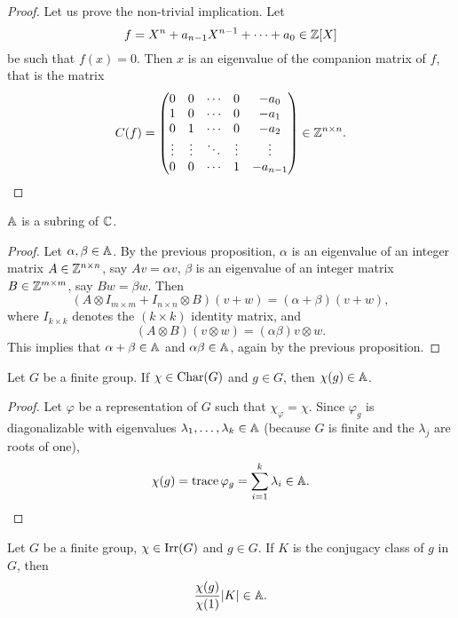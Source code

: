 \begin{proof}
    Let us prove the non-trivial implication. Let 
    \[
    f=X^n+a_{n-1}X^{n-1}+\cdots+a_0\in\mathbb{Z}[X]
    \]
    be such that $f(x)=0$. Then $x$ is an eigenvalue
    of the companion matrix of $f$, that is the matrix
    \[
    C(f)=
    \begin{pmatrix}
    0&0&\cdots &0&-a_{0}\\
    1&0&\cdots &0&-a_{1}\\
    0&1&\cdots &0&-a_{2}\\
    \vdots &\vdots &\ddots &\vdots &\vdots \\
    0&0&\cdots &1&-a_{{n-1}}
    \end{pmatrix}
    \in\mathbb{Z}^{n\times n}.\qedhere 
    \]
\end{proof}

\begin{theorem}
\label{thm:Asubring}
    $\mathbb{A}$ is a subring of $\mathbb{C}$. 
\end{theorem}

\begin{proof}
    Let $\alpha,\beta\in\mathbb{A}$. By the previous proposition, 
    $\alpha$ is an eigenvalue 
    of an integer matrix $A\in\mathbb{Z}^{n\times n}$, say
    $Av=\alpha v$, 
    $\beta$ is an eigenvalue of an integer matrix 
    $B\in\mathbb{Z}^{m\times m}$, say $Bw=\beta w$. Then
    \[
    (A\otimes I_{m\times m}+I_{n\times n}\otimes B)(v+w)
    =(\alpha+\beta)(v+w), 
    \]
    where $I_{k\times k}$ denotes the $(k\times k)$ identity 
    matrix, and
    \[
    (A\otimes B)(v\otimes w)=(\alpha\beta)v\otimes w.
    \]
    This implies that 
    $\alpha+\beta\in\mathbb{A}$ and $\alpha\beta\in\mathbb{A}$, again 
    by the previous proposition. 
\end{proof}

\begin{theorem}
\label{thm:A}
    Let $G$ be a finite group. If $\chi\in\operatorname{Char}(G)$ and
    $g\in G$, then $\chi(g)\in\mathbb{A}$. 
\end{theorem}

\begin{proof}
    Let $\varphi$ be a representation of $G$ such that 
    $\chi_\varphi=\chi$. Since $\varphi_g$ is diagonalizable with
    eigenvalues $\lambda_1,\dots,\lambda_k\in\mathbb{A}$ (because
    $G$ is finite and the $\lambda_j$ are roots of one), 
    \[
    \chi(g)=\operatorname{trace}\varphi_g=\sum_{i=1}^k\lambda_i\in\mathbb{A}. \qedhere
    \]
\end{proof}

\begin{theorem}
    Let $G$ be a finite group, $\chi\in\operatorname{Irr}(G)$ and $g\in G$. 
    If $K$ is the conjugacy class of $g$ in $G$, then
    \[
    \frac{\chi(g)}{\chi(1)}|K|\in\mathbb{A}. 
    \]
\end{theorem}

